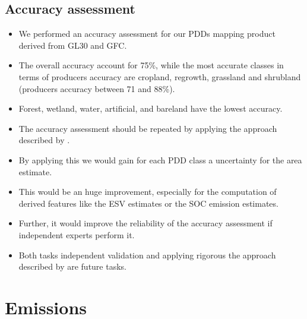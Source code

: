 		\subsection{Accuracy assessment}
		\label{subsec:discussion_accuracy_assessment}
			\begin{itemize}
				\item We performed an accuracy assessment for our \acp{PDD} mapping product derived from \ac{GL30} and \ac{GFC}.
				\item The overall accuracy account for 75\%, while the most accurate classes in terms of producers accuracy are cropland, regrowth, grassland and shrubland (producers accuracy between 71 and 88\%).
				\item Forest, wetland, water, artificial, and bareland have the lowest accuracy.
				\item The accuracy assessment should be repeated by applying the approach described by \citet{Olofsson2014}.
				\item By applying this we would gain for each \ac{PDD} class a uncertainty for the area estimate.
				\item This would be an huge improvement, especially for the computation of derived features like the \ac{ESV} estimates or the \ac{SOC} emission estimates.
				\item Further, it would improve the reliability of the accuracy assessment if independent experts perform it.
				\item Both tasks independent validation and applying rigorous the approach described by \citeauthor{Olofsson2014} are future tasks. 
			\end{itemize}
	\section{Emissions}

